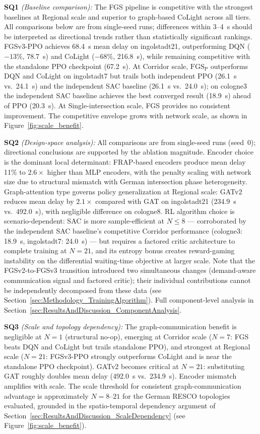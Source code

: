 \noindent\textbf{SQ1} \textit{(Baseline comparison):} The FGS pipeline is competitive with the strongest baselines at Regional scale and superior to graph-based CoLight across all tiers. All comparisons below are from single-seed runs; differences within 3--4~s should be interpreted as directional trends rather than statistically significant rankings. FGSv3-PPO achieves 68.4~s mean delay on ingolstadt21, outperforming DQN ($-13\%$, 78.7~s) and CoLight ($-68\%$, 216.8~s), while remaining competitive with the standalone PPO checkpoint (67.2~s). At Corridor scale, $\text{FGS}_\text{P}$ outperforms DQN and CoLight on ingolstadt7 but trails both independent PPO (26.1~s vs.\ 24.1~s) and the independent SAC baseline (26.1~s vs.\ 24.0~s); on cologne3 the independent SAC baseline achieves the best converged result (18.9~s) ahead of PPO (20.3~s). At Single-intersection scale, FGS provides no consistent improvement. The competitive envelope grows with network scale, as shown in Figure~\ref{fig:scale_benefit}.

\medskip
\noindent\textbf{SQ2} \textit{(Design-space analysis):} All comparisons are from single-seed runs (seed~0); directional conclusions are supported by the ablation magnitude. Encoder choice is the dominant local determinant: FRAP-based encoders produce mean delay 11\% to $2.6\times$ higher than MLP encoders, with the penalty scaling with network size due to structural mismatch with German intersection phase heterogeneity. Graph-attention type governs policy generalization at Regional scale: GATv2 reduces mean delay by $2.1\times$ compared with GAT on ingolstadt21 (234.9~s vs.\ 492.0~s), with negligible difference on cologne8. RL algorithm choice is scenario-dependent: SAC is more sample-efficient at $N \leq 8$ --- corroborated by the independent SAC baseline's competitive Corridor performance (cologne3: 18.9~s, ingolstadt7: 24.0~s) --- but requires a factored critic architecture to complete training at $N=21$, and its entropy bonus creates reward-gaming instability on the differential waiting-time objective at larger scale. Note that the FGSv2-to-FGSv3 transition introduced two simultaneous changes (demand-aware communication signal and factored critic); their individual contributions cannot be independently decomposed from these data (see Section~\ref{sec:Methodology_TrainingAlgorithm}). Full component-level analysis in Section~\ref{sec:ResultsAndDiscussion_ComponentAnalysis}.

\medskip
\noindent\textbf{SQ3} \textit{(Scale and topology dependency):} The graph-communication benefit is negligible at $N=1$ (structural no-op), emerging at Corridor scale ($N=7$: FGS beats DQN and CoLight but trails standalone PPO), and strongest at Regional scale ($N=21$: FGSv3-PPO strongly outperforms CoLight and is near the standalone PPO checkpoint). GATv2 becomes critical at $N=21$: substituting GAT roughly doubles mean delay (492.0~s vs.\ 234.9~s). Encoder mismatch amplifies with scale. The scale threshold for consistent graph-communication advantage is approximately $N=8$--$21$ for the German RESCO topologies evaluated, grounded in the spatio-temporal dependency argument of Section~\ref{sec:ResultsAndDiscussion_ScaleDependency} (see Figure~\ref{fig:scale_benefit}).

